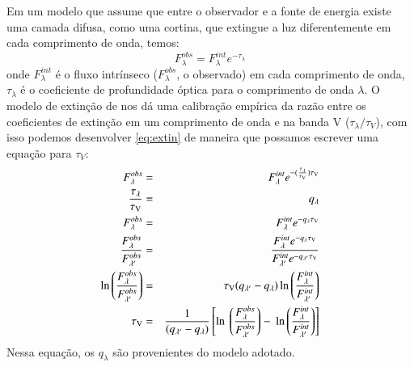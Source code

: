Em um modelo que assume que entre o observador e a fonte de energia existe uma camada difusa, como
uma cortina, que extingue a luz diferentemente em cada comprimento de onda, temos:
\begin{equation}
	F_\lambda^{obs} = F_\lambda^{int} e^{-\tau_\lambda}
    \label{eq:extin}
\end{equation}
\noindent onde $F_\lambda^{int}$ é o fluxo intrínseco ($F_\lambda^{obs}$, o observado) em cada
comprimento de onda, $\tau_\lambda$ é o coeficiente de profundidade óptica para o comprimento de
onda $\lambda$. O modelo de extinção de \citet{CCM1989a} nos dá uma calibração empírica da razão
entre os coeficientes de extinção em um comprimento de onda e na banda V ($\tau_\lambda / \tau_V$),
com isso podemos desenvolver \eqref{eq:extin} de maneira que possamos escrever uma equação para
$\tau_V$:
\begin{eqnarray}
   F_\lambda^{obs} &=& F_\lambda^{int} e^{-(\frac{\tau_\lambda}{\tauV}) \tauV} \\
   \frac{\tau_\lambda}{\tauV} &=& q_\lambda \\
   F_\lambda^{obs} &=& F_\lambda^{int} e^{-q_\lambda \tauV} \\
   \frac{F_\lambda^{obs}}{F_{\lambda^\prime}^{obs}} &=& \
 \frac{F_\lambda^{int} e^{-q_\lambda \tauV}}{F_{\lambda^\prime}^{int} e^{-q_{\lambda^\prime} \tauV}} \\
   \ln \left(\frac{F_\lambda^{obs}}{F_{\lambda^\prime}^{obs}}\right) &=& \
 \tauV (q_{\lambda^\prime} - q_\lambda) \ln \left(\frac{F_\lambda^{int}}{F_{\lambda^\prime}^{int}}\right) \\
   \tauV &=& \frac{1}{(q_{\lambda^\prime} - q_\lambda)} \left[\ln \ 
 \left(\frac{F_\lambda^{obs}}{F_{\lambda^\prime}^{obs}}\right) - \
 \ln \left(\frac{F_\lambda^{int}}{F_{\lambda^\prime}^{int}}\right)\right] 
 \label{eq:tauV}
\end{eqnarray}
\noindent Nessa equação, os $q_\lambda$ são provenientes do modelo adotado.

